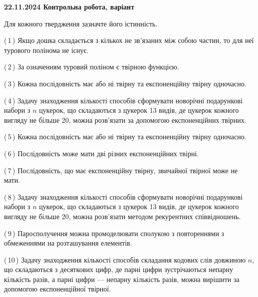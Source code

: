 \documentclass[12pt, ukrainian]{article}
\begin{document}
\begin {large}
\begin {large}
\begin {large}
\begin {large}
\begin {large}
\begin {large}
\begin {large}
\begin {large}
\begin {large}
\begin {large}
\begin {large}
\begin {large}
\begin {large}
\begin {large}
\begin {large}

\textbf{22.11.2024 Контрольна робота, варіант  }\par


{
Для кожного твердження зазначте його істинність.\par

\vspace{2mm}

(\,1\,) Якщо дошка складається з кількох не зв’язаних між собою частин, то для неї турового полінома не існує.%



(\,2\,) За означенням туровий поліном є твірною функцією.%



(\,3\,) Кожна послідовність має або ні твірну та експоненційну твірну одночасно.%



(\,4\,) Задачу знаходження кількості способів сформувати новорічні подарункові набори з $n$ цукерок, що складаються з цукерок 13 видів, де цукерок кожного вигляду не більше 20, можна розв’язати за допомогою експоненційних твірних.%



(\,5\,) Кожна послідовність має або ні твірну та експоненційну твірну одночасно.%



(\,6\,) Послідовність може мати дві різних експоненційних твірні.%



(\,7\,) Послідовність, що має експоненційну твірну, звичайної твірної може не мати.%



(\,8\,) Задачу знаходження кількості способів сформувати новорічні подарункові набори з $n$ цукерок, що складаються з цукерок 13 видів, де цукерок кожного вигляду не більше 20, можна розв’язати методом рекурентних співвідношень.%



(\,9\,) Паросполучення можна промоделювати сполукою з повтореннями з обмеженнями на розташування елементів.%



(\,10\,) Задачу знаходження кількості способів складання кодових слів довжиною $n$, що складаються з десяткових цифр, де парні цифри зустрічаються непарну кількість разів, а парні цифри — непарну кількість разів, можна вирішити за допомогою експоненційної твірної.%




}
\end{large}
\end{large}
\end{large}
\end{large}
\end{large}
\end{large}
\end{large}
\end{large}
\end{large}
\end{large}
\end{large}
\end{large}
\end{large}
\end{large}
\end{large}
\end{document}
